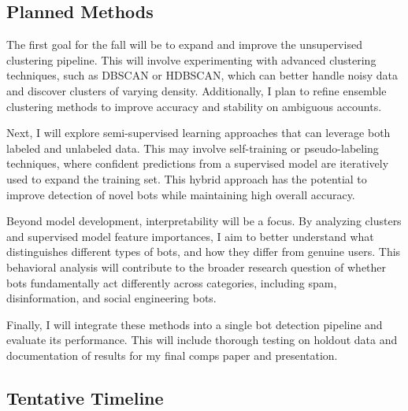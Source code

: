 \documentclass[10pt,twocolumn]{article}
\begin{document}
\subsection{Planned Methods}

The first goal for the fall will be to expand and improve the unsupervised clustering pipeline. This will involve experimenting with advanced clustering techniques, such as DBSCAN or HDBSCAN, which can better handle noisy data and discover clusters of varying density. Additionally, I plan to refine ensemble clustering methods to improve accuracy and stability on ambiguous accounts.

Next, I will explore semi-supervised learning approaches that can leverage both labeled and unlabeled data. This may involve self-training or pseudo-labeling techniques, where confident predictions from a supervised model are iteratively used to expand the training set. This hybrid approach has the potential to improve detection of novel bots while maintaining high overall accuracy.

Beyond model development, interpretability will be a focus. By analyzing clusters and supervised model feature importances, I aim to better understand what distinguishes different types of bots, and how they differ from genuine users. This behavioral analysis will contribute to the broader research question of whether bots fundamentally act differently across categories, including spam, disinformation, and social engineering bots.

Finally, I will integrate these methods into a single bot detection pipeline and evaluate its performance. This will include thorough testing on holdout data and documentation of results for my final comps paper and presentation.

\subsection{Tentative Timeline}
\end{document}
